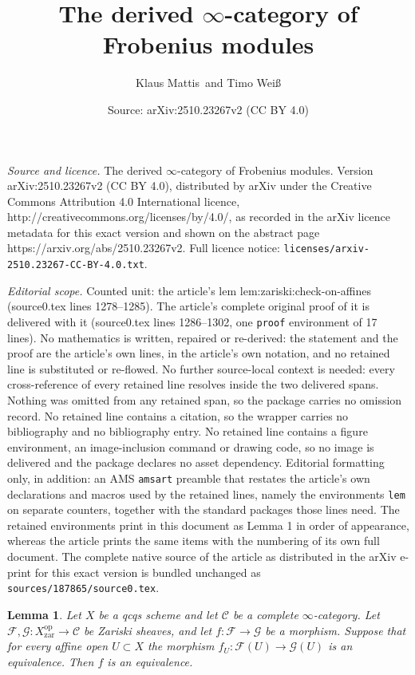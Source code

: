 \documentclass[10pt,a4paper]{amsart}
\title{The derived \texorpdfstring{$\infty$}{infinity}-category of Frobenius modules}
\author{Klaus Mattis\, and Timo Weiß}
\date{Source: arXiv:2510.23267v2 (CC BY 4.0)}
\newtheorem{lem}{Lemma}
\newcommand{\Cat}[1]{\mathcal{#1}}
\newcommand{\op}[1]{#1^{\operatorname{op}}}
\newcommand{\zar}{\operatorname{zar}}
\begin{document}
\maketitle

\noindent\emph{Source and licence.} The derived \texorpdfstring{$\infty$}{infinity}-category of Frobenius modules. Version arXiv:2510.23267v2 (CC BY 4.0), distributed by arXiv under the Creative Commons Attribution 4.0 International licence, http://creativecommons.org/licenses/by/4.0/, as recorded in the arXiv licence metadata for this exact version and shown on the abstract page https://arxiv.org/abs/2510.23267v2. Full licence notice: \texttt{licenses/arxiv-2510.23267-CC-BY-4.0.txt}.\par\smallskip

\noindent\textit{Editorial scope.} Counted unit: the article's lem lem:zariski:check-on-affines (source0.tex lines 1278--1285). The article's complete original proof of it is delivered with it (source0.tex lines 1286--1302, one \texttt{proof} environment of 17 lines). No mathematics is written, repaired or re-derived: the statement and the proof are the article's own lines, in the article's own notation, and no retained line is substituted or re-flowed.  No further source-local context is needed: every cross-reference of every retained line resolves inside the two delivered spans.  Nothing was omitted from any retained span, so the package carries no omission record.  No retained line contains a citation, so the wrapper carries no bibliography and no bibliography entry.  No retained line contains a figure environment, an image-inclusion command or drawing code, so no image is delivered and the package declares no asset dependency.  Editorial formatting only, in addition: an AMS \texttt{amsart} preamble that restates the article's own declarations and macros used by the retained lines, namely the environments \texttt{lem} on separate counters, together with the standard packages those lines need.  The retained environments print in this document as Lemma 1 in order of appearance, whereas the article prints the same items with the numbering of its own full document.  The complete native source of the article as distributed in the arXiv e-print for this exact version is bundled unchanged as \texttt{sources/187865/source0.tex}.
\begin{lem} \label{lem:zariski:check-on-affines}
    Let $X$ be a qcqs scheme and let $\Cat C$ be a complete $\infty$-category.
    Let $\Cat F, \Cat G \colon \op X_{\zar} \to \Cat C$ be Zariski sheaves,
    and let $f \colon \Cat F \to \Cat G$ be a morphism.
    Suppose that for every affine open $U \subset X$ 
    the morphism $f_U \colon \Cat F(U) \to \Cat G(U)$ is an equivalence.
    Then $f$ is an equivalence.
\end{lem}
\end{document}

